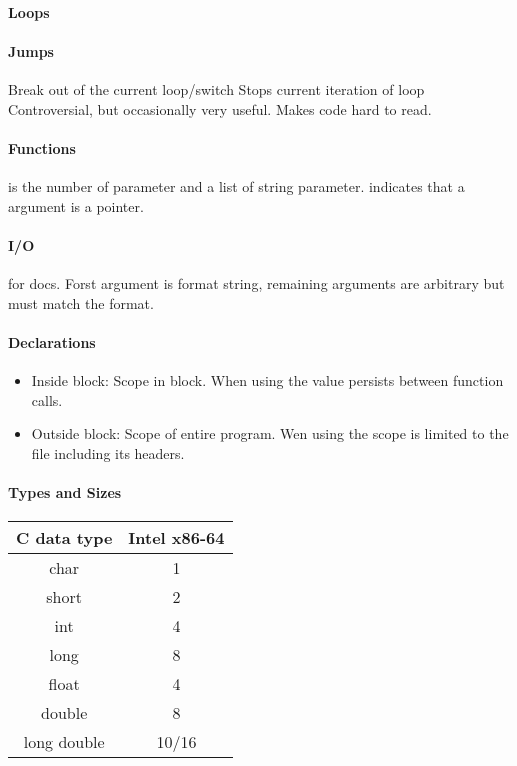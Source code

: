 \paragraph{Loops}

\paragraph{Jumps}
 Break out of the current loop/switch
 Stops current iteration of loop
 Controversial, but occasionally very useful. Makes code hard to read.

\paragraph{Functions}
 is the number of parameter and  a list of string parameter.
\code{*} indicates that a argument is a pointer.

\paragraph{I/O}
 for docs. Forst argument is format string, remaining arguments are arbitrary but must match the format.

\paragraph{Declarations}

\begin{itemize}
    \item Inside block: Scope in block. When using  the value persists between function calls.
    \item Outside block: Scope of entire program. Wen using  the scope is limited to the file including its headers.
\end{itemize}

\paragraph{Types and Sizes}
\begin{table}[H]
    \centering
    \begin{tabular}{c | c}
        C data type & Intel x86-64\\
        \hline
        char & 1\\
        short & 2\\
        int & 4\\
        long & 8\\
        float & 4\\
        double & 8\\
        long double & 10/16\\
    \end{tabular}
\end{table}

